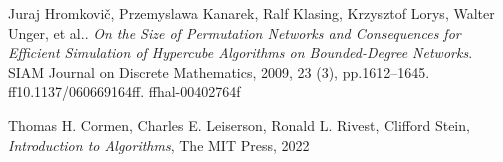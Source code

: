 \documentclass[a4paper]{article}
\theoremstyle{definition}
\begin{document}




\begin{thebibliography}{9}
Juraj Hromkovič, Przemyslawa Kanarek, Ralf Klasing, Krzysztof Lorys, Walter Unger, et al.. \emph{On the Size of Permutation Networks and Consequences for Efficient Simulation of Hypercube Algorithms on Bounded-Degree Networks}. SIAM Journal on Discrete Mathematics, 2009, 23 (3), pp.1612–1645. ff10.1137/060669164ff. ffhal-00402764f

Thomas H. Cormen, Charles E. Leiserson, Ronald L. Rivest, Clifford Stein, \emph{Introduction to Algorithms}, The MIT Press, 2022
\end{thebibliography}
\end{document}
